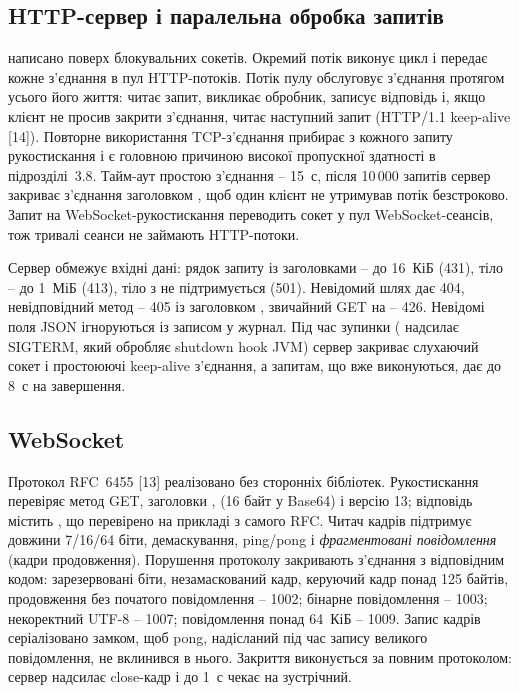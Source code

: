 \subsection{HTTP-сервер і паралельна обробка запитів}

 написано поверх блокувальних сокетів. Окремий потік виконує цикл
 і передає кожне з'єднання в пул HTTP-потоків. Потік пулу обслуговує з'єднання
протягом усього його життя: читає запит, викликає обробник, записує відповідь і, якщо клієнт
не просив закрити з'єднання, читає наступний запит (HTTP/1.1 keep-alive [14]). Повторне
використання TCP-з'єднання прибирає з кожного запиту рукостискання і є головною причиною
високої пропускної здатності в підрозділі~3.8. Тайм-аут простою з'єднання -- 15~с, після
10\,000 запитів сервер закриває з'єднання заголовком , щоб один клієнт
не утримував потік безстроково. Запит на WebSocket-рукостискання переводить сокет у пул
WebSocket-сеансів, тож тривалі сеанси не займають HTTP-потоки.

Сервер обмежує вхідні дані: рядок запиту із заголовками -- до 16~КіБ (431), тіло -- до 1~МіБ
(413), тіло з  не підтримується (501). Невідомий шлях дає 404,
невідповідний метод -- 405 із заголовком , звичайний GET на  --
426. Невідомі поля JSON ігноруються із записом у журнал. Під час зупинки (
надсилає SIGTERM, який обробляє shutdown hook JVM) сервер закриває слухаючий сокет і
простоюючі keep-alive з'єднання, а запитам, що вже виконуються, дає до 8~с на завершення.

\subsection{WebSocket}

Протокол RFC~6455 [13] реалізовано без сторонніх бібліотек. Рукостискання перевіряє метод
GET, заголовки ,  (16 байт у Base64) і версію
13; відповідь містить , що перевірено на
прикладі з самого RFC. Читач кадрів підтримує довжини 7/16/64 біти, демаскування, ping/pong і
\textit{фрагментовані повідомлення} (кадри продовження). Порушення протоколу закривають
з'єднання з відповідним кодом: зарезервовані біти, незамаскований кадр, керуючий кадр понад
125 байтів, продовження без початого повідомлення -- 1002; бінарне повідомлення -- 1003;
некоректний UTF-8 -- 1007; повідомлення понад 64~КіБ -- 1009. Запис кадрів серіалізовано
замком, щоб pong, надісланий під час запису великого повідомлення, не вклинився в нього.
Закриття виконується за повним протоколом: сервер надсилає close-кадр і до 1~с чекає на
зустрічний.


